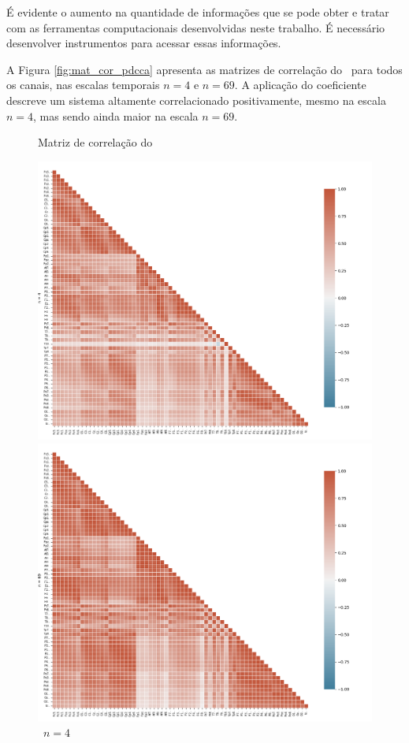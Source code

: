 É evidente o aumento na quantidade de informações que se pode obter e tratar com as ferramentas computacionais desenvolvidas neste trabalho. É necessário desenvolver instrumentos para acessar essas informações.

A Figura \ref{fig:mat_cor_pdcca} apresenta as matrizes de correlação do \pdcca~para todos os canais, nas escalas temporais $n=4$ e $n=69$. A aplicação do coeficiente descreve um sistema altamente correlacionado positivamente, mesmo na escala $n=4$, mas sendo ainda maior na escala $n=69$. 
\begin{figure}[ht]
  \caption{Matriz de correlação do \pdcca}
  \begin{minipage}[b]{0.45\textwidth}
    \includegraphics[width=\textwidth]{./Figures/test_dmc/pdcca4.png}
    \caption{\pdcca~$n = 4$}
  \end{minipage}
  \hfill
  \begin{minipage}[b]{0.45\textwidth}
    \includegraphics[width=\textwidth]{../Figures/test_dmc/pdcca69.png}

\end{minipage}
\end{figure}
